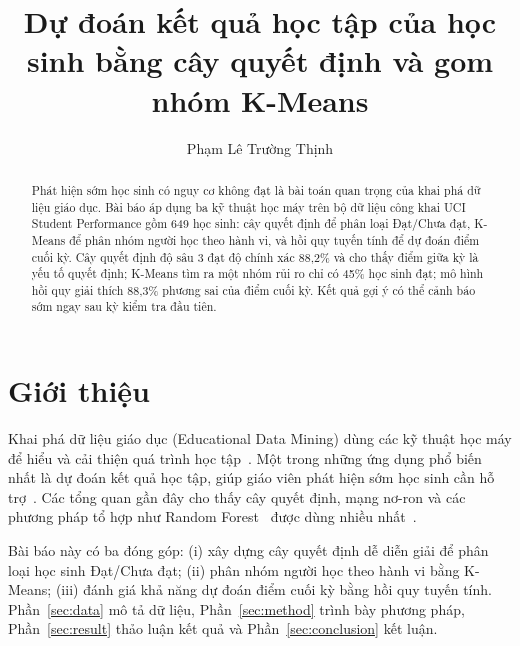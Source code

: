 \documentclass[runningheads]{llncs}
\begin{document}
\title{Dự đoán kết quả học tập của học sinh bằng cây quyết định và gom nhóm K-Means}

\author{Phạm Lê Trường Thịnh}

\maketitle

\begin{abstract}
Phát hiện sớm học sinh có nguy cơ không đạt là bài toán quan trọng của khai phá dữ liệu
giáo dục. Bài báo áp dụng ba kỹ thuật học máy trên bộ dữ liệu công khai UCI Student
Performance gồm 649 học sinh: cây quyết định để phân loại Đạt/Chưa đạt, K-Means để phân
nhóm người học theo hành vi, và hồi quy tuyến tính để dự đoán điểm cuối kỳ. Cây quyết định
độ sâu 3 đạt độ chính xác 88,2\% và cho thấy điểm giữa kỳ là yếu tố quyết định; K-Means tìm
ra một nhóm rủi ro chỉ có 45\% học sinh đạt; mô hình hồi quy giải thích 88,3\% phương sai
của điểm cuối kỳ. Kết quả gợi ý có thể cảnh báo sớm ngay sau kỳ kiểm tra đầu tiên.
\end{abstract}

\section{Giới thiệu}\label{sec:intro}
Khai phá dữ liệu giáo dục (Educational Data Mining) dùng các kỹ thuật học máy để hiểu và
cải thiện quá trình học tập~\cite{romero2020}. Một trong những ứng dụng phổ biến nhất là dự
đoán kết quả học tập, giúp giáo viên phát hiện sớm học sinh cần hỗ trợ~\cite{shahiri2015,hellas2018}.
Các tổng quan gần đây cho thấy cây quyết định, mạng nơ-ron và các phương pháp tổ hợp như
Random Forest~\cite{breiman2001} được dùng nhiều nhất~\cite{albreiki2021}.

Bài báo này có ba đóng góp: (i) xây dựng cây quyết định dễ diễn giải để phân loại học sinh
Đạt/Chưa đạt; (ii) phân nhóm người học theo hành vi bằng K-Means; (iii) đánh giá khả năng dự
đoán điểm cuối kỳ bằng hồi quy tuyến tính. Phần~\ref{sec:data} mô tả dữ liệu,
Phần~\ref{sec:method} trình bày phương pháp, Phần~\ref{sec:result} thảo luận kết quả và
Phần~\ref{sec:conclusion} kết luận.
\end{document}
